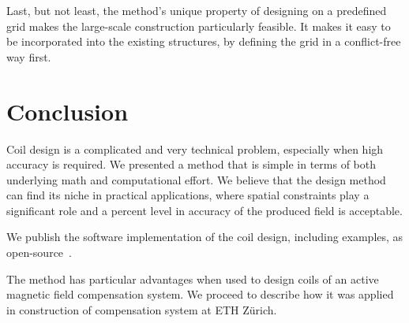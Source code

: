 Last, but not least, the method's unique property of designing on a predefined grid makes the large-scale construction particularly feasible. It makes it easy to be incorporated into the existing structures, by defining the grid in a conflict-free way first.



\section{Conclusion}
Coil design is a complicated and very technical problem, especially when high accuracy is required. We presented a method that is simple in terms of both underlying math and computational effort. We believe that the design method can find its niche in practical applications, where spatial constraints play a significant role and a percent level in accuracy of the produced field is acceptable.


We publish the software implementation of the coil design, including examples, as open-source~\cite{Coilsjlcode}.

The method has particular advantages when used to design coils of an active magnetic field compensation system. We proceed to describe how it was applied in construction of compensation system at ETH Zürich.



  












